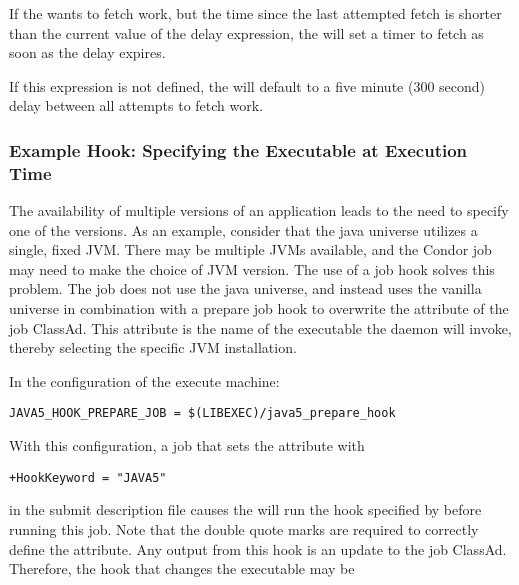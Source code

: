 If the  wants to fetch work, but the time since the
last attempted fetch is shorter than the current value of the delay
expression, the  will set a timer to fetch as soon as
the delay expires.

If this expression is not defined, the  will default to
a five minute (300 second) delay between all attempts to fetch work.

\subsubsection{\label{sec:job-hooks-example}
Example Hook: Specifying the Executable at Execution Time}

The availability of multiple versions of an application leads to
the need to specify one of the versions. 
As an example, consider that 
the java universe utilizes a single, fixed JVM.
There may be multiple JVMs available, and the Condor job may
need to make the choice of JVM version.
The use of a job hook solves this problem.
The job does not use the java universe, and instead uses the
vanilla universe in combination with a 
prepare job hook to overwrite the  attribute of the job ClassAd.
This attribute is the name of the
executable the  daemon will invoke,
thereby selecting the specific JVM installation.

In the configuration of the execute machine:

\footnotesize
\begin{verbatim}
JAVA5_HOOK_PREPARE_JOB = $(LIBEXEC)/java5_prepare_hook
\end{verbatim}
\normalsize

With this configuration, a job that sets the  attribute with

\begin{verbatim}
+HookKeyword = "JAVA5"
\end{verbatim}

in the submit description file causes the 
will run the hook specified by 
before running this job.
Note that the double quote marks are required to correctly define
the attribute.
Any output from this hook is an update to the job ClassAd.  
Therefore, the hook that changes the executable may be

